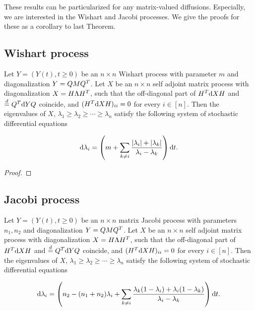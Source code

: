 These results can be particularized for any matrix-valued diffusions. Especially, we are interested in the Wishart and Jacobi processes. We give the proofs for these as a corollary to last Theorem.

\subsection{Wishart process}

\begin{corollary}
    Let $Y = (Y(t), t \ge 0)$ be an $n\times n$ Wishart process with parameter $m$ and diagonalization $Y = QMQ^T$. Let $X$ be an $n\times n$ self adjoint matrix process with diagonalization $X = H \Lambda H^T$, such that the off-diagonal part of $H^T \mathrm d X H $ and $\overset{d}{=} Q^T \mathrm d Y Q$ coincide, and $(H^T \mathrm d X H)_{ii} = 0$ for every $i \in [n]$. Then the eigenvalues of $X$, $\lambda_1 \ge \lambda_2 \ge \cdots \ge \lambda_n$ satisfy the following system of stochastic differential equations

    \begin{equation} \label{eq:deterministic_wishart}
        \mathrm d \lambda_i = \left( m +\sum_{k\neq i} \frac{ \lvert \lambda_i \rvert + \lvert \lambda_k \rvert }{\lambda_i - \lambda_k}\right)\mathrm d t.
    \end{equation}
\end{corollary}

\begin{proof}
    
\end{proof}


\subsection{Jacobi process}

\begin{corollary}
    Let $Y = (Y(t), t \ge 0)$ be an $n\times n$ matrix Jacobi process with parameters $n_1,n_2$ and diagonalization $Y = QMQ^T$. Let $X$ be an $n\times n$ self adjoint matrix process with diagonalization $X = H \Lambda H^T$, such that the off-diagonal part of $H^T \mathrm d X H $ and $\overset{d}{=} Q^T \mathrm d Y Q$ coincide, and $(H^T \mathrm d X H)_{ii} = 0$ for every $i \in [n]$. Then the eigenvalues of $X$, $\lambda_1 \ge \lambda_2 \ge \cdots \ge \lambda_n$ satisfy the following system of stochastic differential equations

    \begin{equation} \label{eq:deterministic_jacobi}
        \mathrm d \lambda_i = \left( n_2 - (n_1 + n_2)\lambda_i + \sum_{k\neq i} \frac{\lambda_k(1-\lambda_i) + \lambda_i(1-\lambda_k)}{\lambda_i - \lambda_k} \right)\mathrm d t.
    \end{equation}

\end{corollary}

